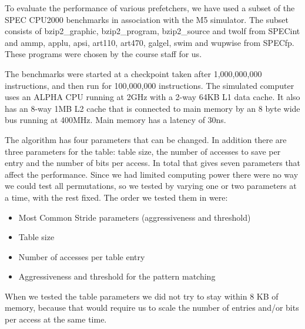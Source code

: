 To evaluate the performance of various prefetchers, we have used
a subset of the SPEC CPU2000 benchmarks in association with the M5
simulator. The subset consists of bzip2\_graphic, bzip2\_program, bzip2\_source and twolf from
SPECint and ammp, applu, apsi, art110, art470, galgel, swim and wupwise from SPECfp.
These programs were chosen by the course staff for us.

The benchmarks were started at a checkpoint taken after
1,000,000,000 instructions, and then run for 100,000,000 instructions.
The simulated computer uses an ALPHA CPU running at 2GHz
with a 2-way 64KB L1 data cache. It also has an 8-way 1MB L2 cache that is
connected to main memory by an 8 byte wide bus running at
400MHz. Main memory has a latency of 30ns.

The algorithm has four parameters that can be changed. In addition there are
three parameters for the table: table size, the number of accesses to save per
entry and the number of bits per access. In total that gives seven parameters
that affect the performance. Since we had limited computing power there were no
way we could test all permutations, so we tested by varying one or two
parameters at a time, with the rest fixed. The order we tested them in were:

\begin{itemize}
	\item Most Common Stride parameters (aggressiveness and threshold)
	\item Table size
	\item Number of accesses per table entry
	\item Aggressiveness and threshold for the pattern matching
\end{itemize}

When we tested the table parameters we did not try to stay within 8 KB of
memory, because that would require us to scale the number of entries and/or
bits per access at the same time.

